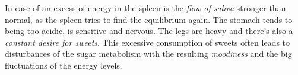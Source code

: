 \documentclass[../Book.Stress_regulation.tex]{subfiles}
\begin{document}
In case of an excess of energy in the spleen is the \emph{flow of saliva} stronger than normal, as the spleen tries to find the equilibrium again.
The stomach tends to being too acidic, is sensitive and nervous.
The legs are heavy and there's also a \emph{constant desire for sweets}.
This excessive consumption of sweets often leads to disturbances of the sugar metabolism with the resulting \emph{moodiness} and the big fluctuations of the energy levels.
\end{document}

